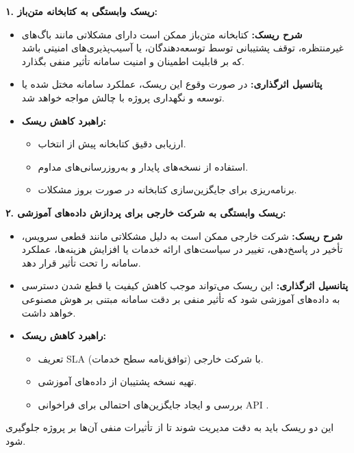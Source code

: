 
	\textbf{۱. ریسک وابستگی به کتابخانه متن‌باز:}
	\begin{itemize}
		\item \textbf{شرح ریسک:} کتابخانه متن‌باز ممکن است دارای مشکلاتی مانند باگ‌های غیرمنتظره، توقف پشتیبانی توسط توسعه‌دهندگان، یا آسیب‌پذیری‌های امنیتی باشد که بر قابلیت اطمینان و امنیت سامانه تأثیر منفی بگذارد.
		\item \textbf{پتانسیل اثرگذاری:} در صورت وقوع این ریسک، عملکرد سامانه مختل شده یا توسعه و نگهداری پروژه با چالش مواجه خواهد شد.
		\item \textbf{راهبرد کاهش ریسک:} 
		\begin{itemize}
			\item ارزیابی دقیق کتابخانه پیش از انتخاب.
			\item استفاده از نسخه‌های پایدار و به‌روزرسانی‌های مداوم.
			\item برنامه‌ریزی برای جایگزین‌سازی کتابخانه در صورت بروز مشکلات.
		\end{itemize}
	\end{itemize}
	
	\textbf{۲. ریسک وابستگی به شرکت خارجی برای پردازش داده‌های آموزشی:}
	\begin{itemize}
		\item \textbf{شرح ریسک:} شرکت خارجی ممکن است به دلیل مشکلاتی مانند قطعی سرویس، تأخیر در پاسخ‌دهی، تغییر در سیاست‌های ارائه خدمات یا افزایش هزینه‌ها، عملکرد سامانه را تحت تأثیر قرار دهد.
		\item \textbf{پتانسیل اثرگذاری:} این ریسک می‌تواند موجب کاهش کیفیت یا قطع شدن دسترسی به داده‌های آموزشی شود که تأثیر منفی بر دقت سامانه مبتنی بر هوش مصنوعی خواهد داشت.
		\item \textbf{راهبرد کاهش ریسک:} 
		\begin{itemize}
			\item تعریف SLA (توافق‌نامه سطح خدمات) با شرکت خارجی.
			\item تهیه نسخه پشتیبان از داده‌های آموزشی.
			\item بررسی و ایجاد جایگزین‌های احتمالی برای فراخوانی API .
		\end{itemize}
	\end{itemize}
	
	این دو ریسک باید به دقت مدیریت شوند تا از تأثیرات منفی آن‌ها بر پروژه جلوگیری شود.

